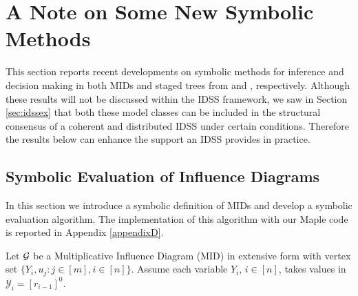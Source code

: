 \section{A Note on Some New Symbolic Methods}
\label{sec:short}
This section reports recent developments on symbolic methods for inference and decision making in both MIDs and staged trees from \citet{Leonelli2015a} and \citet{Gorgen2015}, respectively. Although these results will not be discussed within the IDSS framework, we saw in Section \ref{sec:idssex} that both these model classes can be included in the structural consensus of a coherent and distributed IDSS under certain conditions. Therefore the results below can enhance the support an IDSS provides in practice. 
 
\subsection{Symbolic Evaluation of Influence Diagrams}
\label{sec:symbolic}
In this section we introduce a symbolic definition of MIDs and develop a symbolic evaluation algorithm. The implementation of this algorithm with our Maple code is reported in Appendix \ref{appendixD}. 

Let $\mathcal{G}$ be a Multiplicative Influence Diagram (MID) in extensive form with vertex set $\{Y_i, u_j:j\in[m], i\in[n]\}$. Assume each variable $Y_i$, $i\in[n]$, takes values in $\mathcal{Y}_i=[r_{i-1}]^0$.

